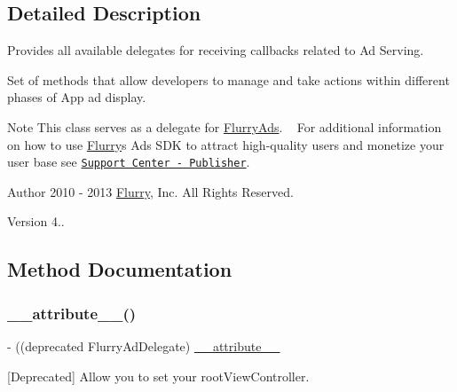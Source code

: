 \subsection{Detailed Description}
Provides all available delegates for receiving callbacks related to Ad Serving. 

Set of methods that allow developers to manage and take actions within different phases of App ad display.

\begin{DoxyNote}{Note}
This class serves as a delegate for \hyperlink{interfaceFlurryAds}{Flurry\+Ads}. ~\newline
For additional information on how to use \hyperlink{interfaceFlurry}{Flurry}\textquotesingle{}s Ads S\+DK to attract high-\/quality users and monetize your user base see \href{http://wiki.flurry.com/index.php?title=Publisher}{\tt Support Center -\/ Publisher}. 
\end{DoxyNote}
\begin{DoxyAuthor}{Author}
2010 -\/ 2013 \hyperlink{interfaceFlurry}{Flurry}, Inc. All Rights Reserved. 
\end{DoxyAuthor}
\begin{DoxyVersion}{Version}
4.. 
\end{DoxyVersion}


\subsection{Method Documentation}
\mbox{\label{protocolFlurryAdDelegate_01-p_ae9d0c306e8852b82f57c2d321e4f95ba}} 
\subsubsection{\texorpdfstring{\+\_\+\+\_\+attribute\+\_\+\+\_\+()}{\_\_attribute\_\_()}}
{\footnotesize\ttfamily -\/ ((deprecated Flurry\+Ad\+Delegate) \hyperlink{struct____attribute____}{\+\_\+\+\_\+attribute\+\_\+\+\_\+} \begin{DoxyParamCaption}{ }\end{DoxyParamCaption}}



\mbox{[}Deprecated\mbox{]} Allow you to set your root\+View\+Controller. 


